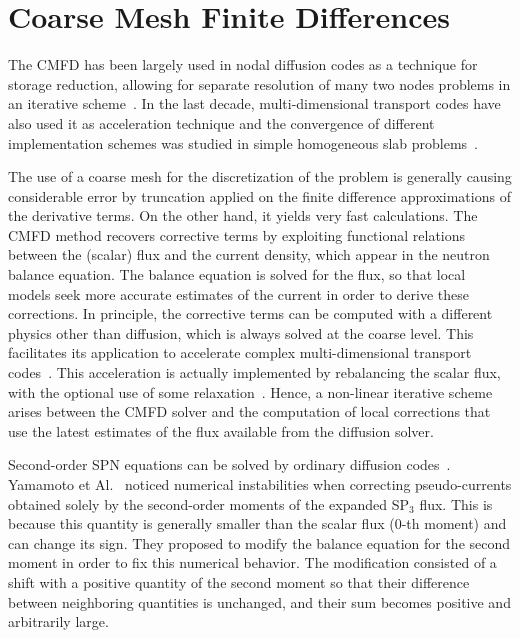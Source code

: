 \section{Coarse Mesh Finite Differences}
\label{sec:CMFD-intro}

The CMFD has been largely used in nodal diffusion codes as a technique for storage reduction, allowing for separate resolution of many two nodes problems in an iterative scheme~\cite{Smith-1983,Lawrence-1986}. In the last decade, multi-dimensional transport codes have also used it as acceleration technique and the convergence of different implementation schemes was studied in simple homogeneous slab problems~\cite{Jarrett-2016,Shen-2019}.

The use of a coarse mesh for the discretization of the problem is generally causing considerable error by truncation applied on the finite difference approximations of the derivative terms. On the other hand, it yields very fast calculations. The CMFD method recovers corrective terms by exploiting functional relations between the (scalar) flux and the current density, which appear in the neutron balance equation. The balance equation is solved for the flux, so that local models seek more accurate estimates of the current in order to derive these corrections. In principle, the corrective terms can be computed with a different physics other than diffusion, which is always solved at the coarse level. This facilitates its application to accelerate complex multi-dimensional transport codes~\cite{Zhu-2016,Shen-2019,Zhang-2019}. This acceleration is actually implemented by rebalancing the scalar flux, with the optional use of some relaxation~\cite{Park-2017,Shen-2019}. Hence, a non-linear iterative scheme arises between the CMFD solver and the computation of local corrections that use the latest estimates of the flux available from the diffusion solver.

Second-order SPN equations can be solved by ordinary diffusion codes~\cite{Larsen-1993}. Yamamoto et Al.~\cite{Yamamoto-2016} noticed numerical instabilities when correcting pseudo-currents obtained solely by the second-order moments of the expanded SP$_3$ flux. This is because this quantity is generally smaller than the scalar flux (0-th moment) and can change its sign. They proposed to modify the balance equation for the second moment in order to fix this numerical behavior. The modification consisted of a shift with a positive quantity of the second moment so that their difference between neighboring quantities is unchanged, and their sum becomes positive and arbitrarily large.

